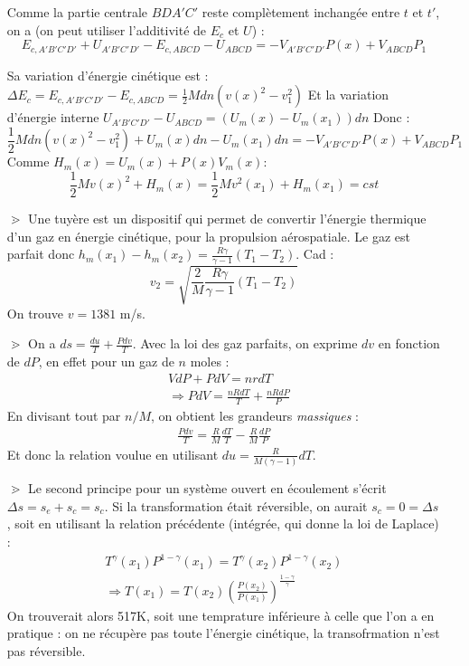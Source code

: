 \documentclass{report}
\begin{document}
\begin{itemize}
Comme la partie centrale $BDA'C'$ reste complètement inchangée entre $t$ et $t'$, on a (on peut utiliser l'additivité de $E_c$ et $U$) : 
\begin{equation}
	E_{c,A'B'C'D'} + U_{A'B'C'D'} - E_{c,ABCD} - U_{ABCD}  = -V_{A'B'C'D'}P(x)+V_{ABCD}P_1
\end{equation}

Sa variation d'énergie cinétique est :
 $\Delta E_c =  E_{c,A'B'C'D'} - E_{c,ABCD} = \frac{1}{2}Mdn\left(v(x)^2-v_1^2\right) $
Et la variation d'énergie interne $U_{A'B'C'D'} - U_{ABCD}=(U_m(x) - U_m(x_1))dn$
Donc : 
	\begin{equation}
	\frac{1}{2}Mdn\left(v(x)^2-v_1^2\right) + U_m(x)dn - U_m(x_1)dn = -V_{A'B'C'D'}P(x)+V_{ABCD}P_1
\end{equation}
Comme $H_m(x) = U_m(x)+P(x)V_m(x)$:
	\begin{equation}
	\frac{1}{2}M v(x)^2+ H_m(x)  =\frac{1}{2}M v^2(x_1) + H_m(x_1) = cst
\end{equation}
\item[$\gtrdot$] Une tuyère est un dispositif qui permet de convertir l'énergie thermique d'un gaz en énergie cinétique, pour la propulsion aérospatiale. Le gaz est parfait donc $h_m(x_1)-h_m(x_2)=\frac{R\gamma}{\gamma-1}(T_1-T_2)$. Cad : 
\begin{equation}
	v_2=\sqrt{\frac{2}{M}\frac{R\gamma}{\gamma-1}(T_1-T_2)}
\end{equation}
On trouve $v=1381$ m/s.

\item[$\gtrdot$] On a $ds=\frac{du}{T}+\frac{Pdv}{T}$. Avec la loi des gaz parfaits, on exprime $dv$ en fonction de $dP$, en effet pour un gaz de $n$ moles :
\begin{align*}
	&VdP + PdV=nrdT \\
	&\Rightarrow PdV = \frac{nRdT}{T}+\frac{nRdP}{P}
\end{align*}
En divisant tout par $n/M$, on obtient les grandeurs \textit{massiques} :
\begin{align*}
	\frac{Pdv}{T}=\frac{R}{M}\frac{dT}{T}-\frac{R}{M}\frac{dP}{P}
\end{align*}
Et donc la relation voulue en utilisant $du=\frac{R}{M(\gamma-1)}dT$.

\item[$\gtrdot$] Le second principe pour un système ouvert en écoulement s'écrit $\Delta s =s_e+s_c=s_c$. Si la transformation était réversible, on aurait $s_c=0=\Delta s$, soit en utilisant la relation précédente (intégrée, qui donne la loi de Laplace) :
\begin{align*}
	T^\gamma(x_1)P^{1-\gamma}(x_1)=T^\gamma(x_2)P^{1-\gamma}(x_2) \\
	\Rightarrow T(x_1)=T(x_2)\left( \frac{P(x_2)}{P(x_1)}\right)^{\frac{1-\gamma}{\gamma}}
\end{align*} 
On trouverait alors 517K, soit une temprature inférieure à celle que l'on a en pratique : on ne récupère pas toute l'énergie cinétique, la transofrmation n'est pas réversible.


\end{itemize}
\end{document}
